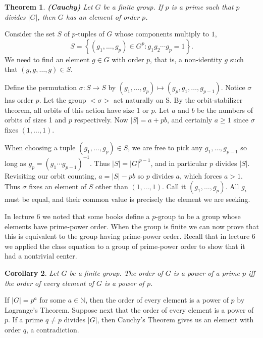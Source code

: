 \documentclass[letterpaper]{article}
\newtheorem{theorem}{Theorem}[section]
\newtheorem{corollary}[theorem]{Corollary}
\newenvironment{proof}[1][Proof]{\begin{trivlist}
\item[\hskip \labelsep {\bfseries #1}]}{\end{trivlist}}
\begin{document}
\begin{theorem}
\emph{\textbf{(Cauchy)}}
Let $G$ be a finite group. If $p$ is a prime such that $p$ divides $|G|$, then $G$ has an element of order $p$.
\end{theorem}
\begin{proof}
Consider the set $S$ of $p$-tuples of $G$ whose components multiply to $1$,
\[S = \left\{ (g_1, \dots, g_p) \in G^p\colon g_1 g_2\cdots g_p = 1 \right\}.\]
We need to find an element $g \in G$ with order $p$, that is, a non-identity $g$ such that $(g, g, \ldots, g) \in S$.

Define the permutation $\sigma\colon S \rightarrow S$ by $(g_1, \dots, g_p) \mapsto (g_p, g_1, \dots, g_{p-1})$. Notice $\sigma$ has order $p$. Let the group ${<}\sigma{>}$ act naturally on S. By the orbit-stabilizer theorem, all orbits of this action have size 1 or $p$. Let $a$ and $b$ be the numbers of orbits of sizes 1 and $p$  respectively. Now $|S| = a + pb$, and certainly $a \geq 1$ since $\sigma$ fixes $(1, \ldots, 1)$.

When choosing a tuple $(g_1, \ldots, g_p) \in S$, we are free to pick any $g_1, \ldots, g_{p-1}$ so long as $g_p = (g_1 \cdots g_{p-1})^{-1}$. Thus $|S| = |G|^{p-1}$, and in particular $p$ divides $|S|$. Revisiting our orbit counting, $a = |S| - pb$ so $p$ divides $a$, which forces $a > 1$. Thus $\sigma$  fixes an element of $S$ other than $(1, \ldots, 1)$. Call it $(g_1, \ldots, g_p)$. All $g_i$ must be equal, and their common value is precisely the element we are seeking.
\end{proof}

In lecture 6 we noted that some books define a $p$-group to be a group whose elements have prime-power order. When the group is finite we can now prove that this is equivalent to the group having prime-power order. Recall that in lecture 6 we applied the class equation to a group of prime-power order to show that it had a nontrivial center.

\begin{corollary}
Let $G$ be a finite group. The order of $G$ is a power of a prime $p$ iff the order of every element of $G$ is a power of $p$.
\end{corollary}
\begin{proof}
If $|G|=p^a$ for some $a \in \mathbb{N}$, then the order of every element is a power of $p$ by Lagrange's Theorem. Suppose next that the order of every element is a power of $p$. If a prime $q \neq p$ divides $|G|$, then Cauchy's Theorem gives us an element with order $q$, a contradiction.
\end{proof}
\end{document}
